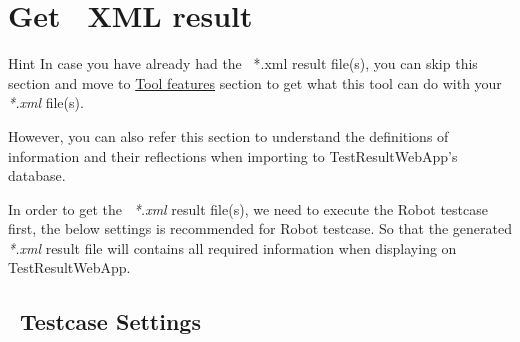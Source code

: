 



\hypertarget{description-get-robotframework-xml-result}{%
\section{Get \rfwcore\ XML result}
\label{description-get-robotframework-xml-result}}

\begin{boxhint}{Hint}
In case you have already had the \rfwcore\ *.xml result file(s), you can skip this section 
and move to \hyperref[description-tool-features]{Tool features} section to get what this 
tool can do with your \emph{*.xml} file(s).

However, you can also refer this section to understand the definitions of \rfwcore
{}information and their reflections when importing to TestResultWebApp's 
database.
\end{boxhint}

In order to get the \rfwcore\ \emph{*.xml} result file(s), we need to execute the Robot testcase
first, the below settings is recommended for Robot testcase. 
So that the generated \emph{*.xml} result file will contains all required information when 
displaying on TestResultWebApp.

\hypertarget{description-robotframework-testcase-settings}{%
\subsection{\rfwcore\ Testcase Settings}
\label{description-robotframework-testcase-settings}}

